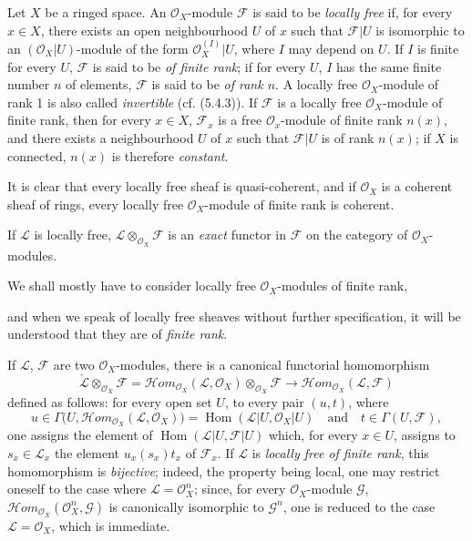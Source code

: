 \begin{env}[5.4.1]
\label{0.5.4.1}
Let $X$ be a ringed space. An $\mathcal{O}_X$-module $\mathcal{F}$
is said to be \emph{locally free} if, for every $x\in X$, there exists an open
neighbourhood $U$ of $x$ such that $\mathcal{F}|U$ is isomorphic to an
$(\mathcal{O}_X|U)$-module of the form $\mathcal{O}_X^{(I)}|U$, where $I$ may
depend on $U$. If $I$ is finite for every $U$, $\mathcal{F}$ is said to be
\emph{of finite rank}; if for every $U$, $I$ has the same finite number $n$
of elements, $\mathcal{F}$ is said to be \emph{of rank $n$}. A
locally free $\mathcal{O}_X$-module of rank 1 is also called
\emph{invertible} (cf. (5.4.3)). If $\mathcal{F}$ is a
locally free $\mathcal{O}_X$-module of finite rank, then for every $x\in X$,
$\mathcal{F}_x$ is a free $\mathcal{O}_x$-module of finite rank $n(x)$, and there
exists a neighbourhood $U$ of $x$ such that $\mathcal{F}|U$ is of rank $n(x)$;
if $X$ is connected, $n(x)$ is therefore \emph{constant}.

It is clear that every locally free sheaf is quasi-coherent, and if
$\mathcal{O}_X$ is a coherent sheaf of rings, every locally free
$\mathcal{O}_X$-module of finite rank is coherent.

If $\mathcal{L}$ is locally free,
$\mathcal{L}\otimes_{\mathcal{O}_X}\mathcal{F}$ is an \emph{exact} functor
in $\mathcal{F}$ on the category of $\mathcal{O}_X$-modules.

We shall mostly have to consider locally free $\mathcal{O}_X$-modules
of finite rank,


and when we speak of locally free sheaves without further specification, it
will be understood that they are of \emph{finite rank}.
\end{env}

\begin{env}[5.4.2]
\label{0.5.4.2}
If $\mathcal{L}$, $\mathcal{F}$ are two $\mathcal{O}_X$-modules, there is a
canonical functorial homomorphism
\[
  \check{\mathcal{L}}\otimes_{\mathcal{O}_X}\mathcal{F}
  =\mathcal{H}\!om_{\mathcal{O}_X}(\mathcal{L},\mathcal{O}_X)
   \otimes_{\mathcal{O}_X}\mathcal{F}
  \longrightarrow
  \mathcal{H}\!om_{\mathcal{O}_X}(\mathcal{L},\mathcal{F})
  \tag{5.4.2.1}\label{0.5.4.2.1}
\]
defined as follows: for every open set $U$, to every pair $(u,t)$, where
\[
  u\in\Gamma\bigl(U,
    \mathcal{H}\!om_{\mathcal{O}_X}(\mathcal{L},\mathcal{O}_X)\bigr)
  =\operatorname{Hom}(\mathcal{L}|U,\mathcal{O}_X|U)
  \quad\text{and}\quad
  t\in\Gamma(U,\mathcal{F}),
\]
one assigns the element of
$\operatorname{Hom}(\mathcal{L}|U,\mathcal{F}|U)$ which, for every $x\in U$,
assigns to $s_x\in\mathcal{L}_x$ the element $u_x(s_x)t_x$ of
$\mathcal{F}_x$. If $\mathcal{L}$ is \emph{locally free of finite rank},
this homomorphism is \emph{bijective}; indeed, the property being local, one may
restrict oneself to the case where $\mathcal{L}=\mathcal{O}_X^n$; since, for every
$\mathcal{O}_X$-module $\mathcal{G}$,
$\mathcal{H}\!om_{\mathcal{O}_X}(\mathcal{O}_X^n,\mathcal{G})$ is
canonically isomorphic to $\mathcal{G}^n$, one is reduced to the case
$\mathcal{L}=\mathcal{O}_X$, which is immediate.
\end{env}

